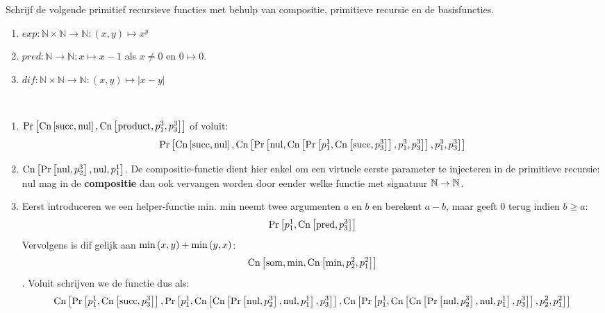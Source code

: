 \documentclass[a4paper]{article}
\newcommand{\prnul}[0]{\ensuremath{\mbox{nul}}}
\newcommand{\prsucc}[0]{\ensuremath{\mbox{succ}}}
\newcommand{\prp}[2]{\ensuremath{p_{#2}^{#1}}}
\newcommand{\prcn}[2]{\funmf{Cn}{#1,#2}}
\newcommand{\prpr}[2]{\funmf{Pr}{#1,#2}}
\newcommand{\N}{\mathbb{N}}
\begin{document}
\begin{question}
Schrijf de volgende primitief recursieve functies met behulp van compositie, primitieve recursie en de basisfuncties.
\begin{enumerate}
  \item $exp : \N \times \N \to \N : (x,y) \mapsto x^y$
  \item $pred : \N \to \N : x \mapsto x - 1$ als $x \neq 0$ en $0 \mapsto 0$.
  \item $dif : \N \times \N \to \N : (x,y) \mapsto | x - y |$
\end{enumerate}
\begin{answer}~~
\begin{enumerate}
 \item $\prpr{\prcn{\prsucc}{\prnul}}{\prcn{\mbox{product}}{\prp{3}{1},\prp{3}{3}}}$ of voluit: \begin{equation}\prpr{\prcn{\prsucc}{\prnul}}{\prcn{\prpr{\prnul}{\prcn{\prpr{\prp{1}{1}}{\prcn{\prsucc}{\prp{3}{3}}}}{\prp{3}{1},\prp{3}{3}}}}{\prp{3}{1},\prp{3}{3}}}\end{equation}
 \item $\prcn{\prpr{\prnul}{\prp{3}{2}}}{\prnul,\prp{1}{1}}$. De compositie-functie dient hier enkel om een virtuele eerste parameter te injecteren in de primitieve recursie: $\prnul$ mag in de \textbf{compositie} dan ook vervangen worden door eender welke functie met signatuur $\mathbb{N}\rightarrow\mathbb{N}$.
 \item Eerst introduceren we een helper-functie $\mbox{min}$. $\mbox{min}$ neemt twee argumenten $a$ en $b$ en berekent $a-b$, maar geeft $0$ terug indien $b\geq a$:\begin{equation}\prpr{\prp{1}{1}}{\prcn{\mbox{pred}}{\prp{3}{3}}}\end{equation}
 Vervolgens is $\mbox{dif}$ gelijk aan $\mbox{min}\left( x,y \right)+\mbox{min}\left( y,x \right)$:\begin{equation}\prcn{\mbox{som}}{\mbox{min},\prcn{\mbox{min}}{\prp{2}{2},\prp{2}{1}}}\end{equation}. Voluit schrijven we de functie dus als:
 \begin{equation}
  \prcn{\prpr{\prp11}{\prcn{\prsucc}{\prp33}}}{\prpr{\prp{1}{1}}{\prcn{\prcn{\prpr{\prnul}{\prp{3}{2}}}{\prnul,\prp{1}{1}}}{\prp{3}{3}}},\prcn{\prpr{\prp{1}{1}}{\prcn{\prcn{\prpr{\prnul}{\prp{3}{2}}}{\prnul,\prp{1}{1}}}{\prp{3}{3}}}}{\prp{2}{2},\prp{2}{1}}}
 \end{equation}
\end{enumerate}
\end{answer}
\end{question}
\end{document}
